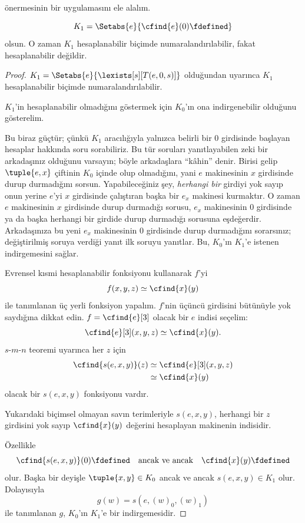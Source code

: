 


 önermesinin bir uygulamasını ele alalım.

\begin{prop}
\[
  K_1=\Setabs{e}{\cfind{e}(0)\fdefined}
\]
olsun. O zaman $K_1$ hesaplanabilir biçimde numaralandırılabilir, fakat
hesaplanabilir değildir.
\end{prop}

\begin{proof}
$K_1=\Setabs{e}{\lexists[s][T(e,0,s)]}$ olduğundan
 uyarınca $K_1$ hesaplanabilir biçimde
numaralandırılabilir.

$K_1$'in hesaplanabilir olmadığını göstermek için $K_0$'ın ona
indirgenebilir olduğunu gösterelim.

\begin{explain}
Bu biraz güçtür; çünkü $K_1$ aracılığıyla yalnızca belirli bir $0$ girdisinde
başlayan hesaplar hakkında soru sorabiliriz. Bu tür soruları yanıtlayabilen
zeki bir arkadaşınız olduğunu varsayın; böyle arkadaşlara ``kâhin'' denir.
Birisi gelip $\tuple{e,x}$ çiftinin $K_0$ içinde olup olmadığını, yani
$e$ makinesinin $x$ girdisinde durup durmadığını sorsun. Yapabileceğiniz şey,
\emph{herhangi bir} girdiyi yok sayıp onun yerine $e$'yi $x$ girdisinde
çalıştıran başka bir $e_x$ makinesi kurmaktır. O zaman $e$ makinesinin $x$
girdisinde durup durmadığı sorusu, $e_x$ makinesinin $0$ girdisinde ya da
başka herhangi bir girdide durup durmadığı sorusuna eşdeğerdir. Arkadaşınıza
bu yeni $e_x$ makinesinin $0$ girdisinde durup durmadığını sorarsınız;
değiştirilmiş soruya verdiği yanıt ilk soruyu yanıtlar. Bu, $K_0$'ın $K_1$'e
istenen indirgemesini sağlar.
\end{explain}

Evrensel kısmi hesaplanabilir fonksiyonu kullanarak $f$'yi
\[
  f(x,y,z)\simeq\cfind{x}(y)
\]
ile tanımlanan üç yerli fonksiyon yapalım. $f$'nin üçüncü girdisini bütünüyle
yok saydığına dikkat edin. $f=\cfind{e}[3]$ olacak bir $e$ indisi seçelim:
\[
  \cfind{e}[3](x,y,z)\simeq\cfind{x}(y).
\]
$s$-$m$-$n$ teoremi uyarınca her $z$ için
\begin{align*}
  \cfind{s(e,x,y)}(z) & \simeq\cfind{e}[3](x,y,z)\\
  & \simeq\cfind{x}(y)
\end{align*}
olacak bir $s(e,x,y)$ fonksiyonu vardır.

\begin{explain}
Yukarıdaki biçimsel olmayan savın terimleriyle $s(e,x,y)$, herhangi bir
$z$ girdisini yok sayıp $\cfind{x}(y)$ değerini hesaplayan makinenin indisidir.
\end{explain}

Özellikle
\[
  \cfind{s(e,x,y)}(0)\fdefined\quad\text{ancak ve ancak}\quad
  \cfind{x}(y)\fdefined
\]
olur. Başka bir deyişle $\tuple{x,y}\in K_0$ ancak ve ancak
$s(e,x,y)\in K_1$ olur. Dolayısıyla
\[
  g(w)=s(e,(w)_0,(w)_1)
\]
ile tanımlanan $g$, $K_0$'ın $K_1$'e bir indirgemesidir.
\end{proof}

